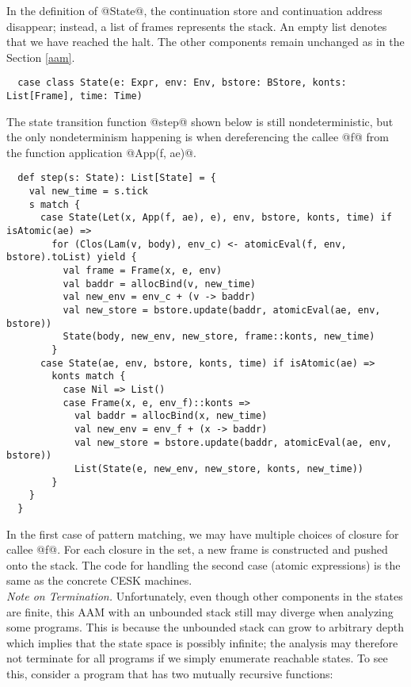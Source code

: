 \documentclass[acmsmall, review]{acmart}\settopmatter{}
\begin{document}
In the definition of @State@, the continuation store and continuation address disappear;
instead, a list of frames represents the stack. An empty list denotes that we have reached 
the halt. The other components remain unchanged as in the Section \ref{aam}.

\begin{lstlisting}
  case class State(e: Expr, env: Env, bstore: BStore, konts: List[Frame], time: Time)
\end{lstlisting}

The state transition function @step@ shown below is still nondeterministic, but the only 
nondeterminism happening is when dereferencing the callee @f@ from the function application 
@App(f, ae)@.

\begin{lstlisting}
  def step(s: State): List[State] = {
    val new_time = s.tick
    s match {
      case State(Let(x, App(f, ae), e), env, bstore, konts, time) if isAtomic(ae) =>
        for (Clos(Lam(v, body), env_c) <- atomicEval(f, env, bstore).toList) yield {
          val frame = Frame(x, e, env)
          val baddr = allocBind(v, new_time)
          val new_env = env_c + (v -> baddr)
          val new_store = bstore.update(baddr, atomicEval(ae, env, bstore))
          State(body, new_env, new_store, frame::konts, new_time)
        }
      case State(ae, env, bstore, konts, time) if isAtomic(ae) =>
        konts match {
          case Nil => List()
          case Frame(x, e, env_f)::konts =>
            val baddr = allocBind(x, new_time)
            val new_env = env_f + (x -> baddr)
            val new_store = bstore.update(baddr, atomicEval(ae, env, bstore))
            List(State(e, new_env, new_store, konts, new_time))
        }
    }
  }
\end{lstlisting}

In the first case of pattern matching, we may have multiple choices of closure for callee @f@.
For each closure in the set, a new frame is constructed and pushed onto the stack.
The code for handling the second case (atomic expressions) is the same as the concrete CESK machines. \\

\textit{Note on Termination.}
Unfortunately, even though other components in the states are finite, this AAM with an unbounded
stack still may diverge when analyzing some programs.
This is because the unbounded stack can grow to arbitrary depth which implies that the state
space is possibly infinite; the analysis may therefore not terminate for all programs if we
simply enumerate reachable states. To see this, consider a program that has two mutually
recursive functions:
\end{document}
